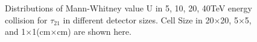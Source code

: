 \documentclass[final,1p,11pt]{elsarticle}
\begin{document}
\begin{figure}
\begin{center}
{   }
   \end{center}
\caption{Distributions of Mann-Whitney value U in 5, 10, 20, 40TeV energy collision for $\tau_{21}$  in different detector sizes. Cell Size in 20$\times$20, 5$\times$5, and 1$\times$1(cm$\times$cm) are shown here.}
\label{fig:cluster_tau21_tau32}
\end{figure}
\end{document}
